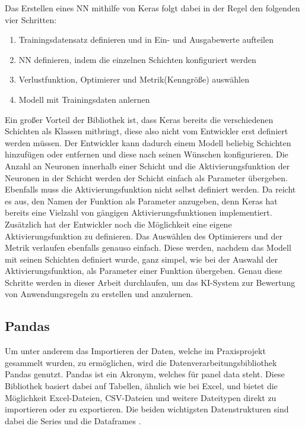 Das Erstellen eines \ac{NN} mithilfe von Keras folgt dabei in der Regel den folgenden vier Schritten:
\begin{enumerate}
    \item Trainingsdatensatz definieren und in Ein- und Ausgabewerte aufteilen \cite[vgl. S.92]{DL_PY}
    \item \ac{NN} definieren, indem die einzelnen Schichten konfiguriert werden \cite[vgl. S.92]{DL_PY}
    \item Verlustfunktion, Optimierer und Metrik(Kenngröße) auswählen \cite[vgl. S.92]{DL_PY}
    \item Modell mit Trainingsdaten anlernen \cite[vgl. S.92]{DL_PY}
\end{enumerate}
Ein großer Vorteil der Bibliothek ist, dass Keras bereits die verschiedenen Schichten als Klassen mitbringt, diese also nicht vom Entwickler erst definiert werden müssen.
Der Entwickler kann dadurch einem Modell beliebig Schichten hinzufügen oder entfernen und diese nach seinen Wünschen konfigurieren. 
Die Anzahl an Neuronen innerhalb einer Schicht und die Aktivierungsfunktion der Neuronen in der Schicht werden der Schicht einfach als Parameter übergeben. 
Ebenfalls muss die Aktivierungsfunktion nicht selbst definiert werden. Da reicht es aus, den Namen der Funktion als Parameter anzugeben, denn Keras hat bereits eine 
Vielzahl von gängigen Aktivierungsfunktionen implementiert. Zusätzlich hat der Entwickler noch die Möglichkeit eine eigene Aktivierungsfunktion zu definieren.
Das Auswählen des Optimierers und der Metrik verlaufen ebenfalls genauso einfach. Diese werden, nachdem das Modell mit seinen Schichten 
definiert wurde, ganz simpel, wie bei der Auswahl der Aktivierungsfunktion, als Parameter einer Funktion übergeben.
Genau diese Schritte werden in dieser Arbeit durchlaufen, um das \ac{KI}-System zur Bewertung von Anwendungsregeln zu erstellen und anzulernen.

\subsection{Pandas}

Um unter anderem das Importieren der Daten, welche im Praxisprojekt gesammelt wurden, zu ermöglichen, wird die Datenverarbeitungsbibliothek Pandas genutzt.
Pandas ist ein Akronym, welches für panel data steht. Diese Bibliothek basiert dabei auf Tabellen, ähnlich wie bei Excel, und bietet die Möglichkeit
Excel-Dateien, CSV-Dateien und weitere Dateitypen direkt zu importieren oder zu exportieren. Die beiden wichtigsten Datenstrukturen sind dabei die
Series und die Dataframes \cite[vgl. S.253]{NumerischesPython}. 

